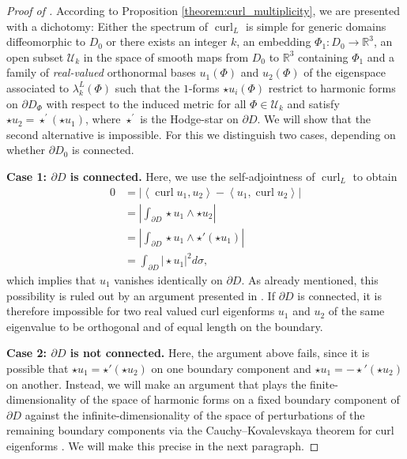 \documentclass[11pt,reqno]{amsart}
\DeclareMathOperator{\curl}{curl}
\newcommand{\hodge}{\!\star\!}
\begin{document}
\begin{proof}[Proof of ]
According to Proposition \ref{theorem:curl_multiplicity}, we are presented with a dichotomy: Either the spectrum of $\curl_L$ is simple for generic domains diffeomorphic to $D_0$ or there exists an integer $k$, an embedding $\Phi_1:D_0\to \mathbb R^3$, an open subset $\mathcal{U}_k$ in the space of smooth maps from $D_0$ to $\mathbb R^3$ containing $\Phi_1$ and a family of \emph{real-valued} orthonormal bases $u_1 (\Phi)$ and $u_2 (\Phi)$ of the eigenspace associated to $\lambda_k^L(\Phi)$ such that the $1$-forms $\star u_i (\Phi)$ restrict to harmonic forms on $\partial D_\Phi$ with respect to the induced metric for all $\Phi \in \mathcal{U}_k$ and satisfy $\star u_2=\star^\prime (\star u_1)$, where $\star^\prime$ is the Hodge-star on $\partial D$. We will show that the second alternative is impossible. For this we distinguish two cases, depending on whether $\partial D_0$ is connected.

    \textbf{Case 1: $\partial D$ is connected.} Here, we use the self-adjointness of $\curl_L$ to obtain
        \begin{align*}
            0 &= \left| \left\langle\curl u_1, u_2 \right\rangle - \left\langle u_1, \curl  u_2 \right\rangle \right| \\
            &= \left| \int_{\partial D} \star u_1 \wedge \star u_2 \right| \\
            &= \left| \int_{\partial D} \star u_1 \wedge \star' (\star u_1) \right|
           \\
           &= \int_{\partial D} |\hodge u_1|^2 d\sigma,
        \end{align*}
        which implies that $u_1$ vanishes identically on $\partial D$. As already mentioned, this possibility is ruled out by an argument presented in \cite[Proof of Proposition 2.3]{EncisoPeralta2020}. If $\partial D$ is connected, it is therefore impossible for two real valued curl eigenforms $u_1$ and $u_2$ of the same eigenvalue to be orthogonal and of equal length on the boundary.
        
        \textbf{Case 2: $\partial D$ is not connected.} Here, the argument above fails, since it is possible that $\star u_1 = \star' (\star u_2)$ on one boundary component and $\star u_1 = -\!\star'\! (\star u_2)$ on another. Instead, we will make an argument that plays the finite-dimensionality of the space of harmonic forms on a fixed boundary component of $\partial D$ against the infinite-dimensionality of the space of perturbations of the remaining boundary components via the Cauchy--Kovalevskaya theorem for curl eigenforms \cite[Theorem 3.1]{EncisoPeralta2012}. We will make this precise in the next paragraph.
        

\end{proof}
\end{document}
